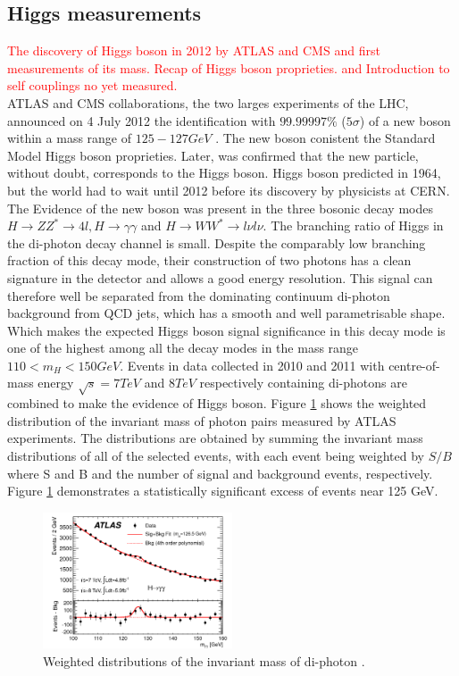 \subsection{Higgs measurements}
\label{chap1:H2012:HM}
\textcolor{red}{The discovery of Higgs boson in 2012 by ATLAS and CMS and first measurements of its mass.
Recap of Higgs boson proprieties. and Introduction to self couplings no yet measured. \\
}
ATLAS and CMS collaborations, the two larges experiments of the LHC, announced on 4 July 2012 the identification with $99.99997\%$ ($5\sigma$) of a new boson within a mass range of $125-127 GeV$ \cite{ATLAS_2012, CMS_2012}. The new boson conistent the Standard Model Higgs boson proprieties. Later, was confirmed that the new particle, without doubt, corresponds to the Higgs boson. Higgs boson predicted in 1964, but the world had to wait until 2012 before its discovery by physicists at CERN. The Evidence of the new boson was present in the three bosonic decay modes $H\rightarrow ZZ^* \rightarrow 4l, H\rightarrow\gamma\gamma$ and $H\rightarrow WW^*\rightarrow l\nu l\nu$. The branching ratio of Higgs in the di-photon decay channel is small. Despite the comparably low branching fraction of this decay mode, their construction of two photons has a clean signature in the detector and allows a good energy resolution. This signal can therefore well be separated from the dominating continuum di-photon background from QCD jets, which has a smooth and well parametrisable shape. Which makes the expected Higgs boson signal significance in this decay mode is one of the highest among all the decay modes in the mass range $110 < m_{H} < 150 GeV$. Events in data collected in 2010 and 2011 with centre-of-mass energy $\sqrt{s}=7 TeV$ and $8 TeV$ respectively containing di-photons are combined to make the evidence of Higgs boson. Figure \ref{fig:chap1:H2012:Hyy} shows the weighted distribution of the invariant mass of photon pairs measured by ATLAS experiments. The distributions are obtained by summing the invariant mass distributions of all of the selected events, with each event being weighted by $S/B$ where S and B and the number of signal and background events, respectively. Figure \ref{fig:chap1:H2012:Hyy} demonstrates a statistically significant excess of events near 125 GeV. \\
\begin{figure}[h!]
    \centering
    \includegraphics[width=0.5\textwidth]{Ch1/Img/Hmyy.png}
    \caption{Weighted distributions of the invariant mass of di-photon \cite{ATLAS_2012}.}
    \label{fig:chap1:H2012:Hyy}
\end{figure}
